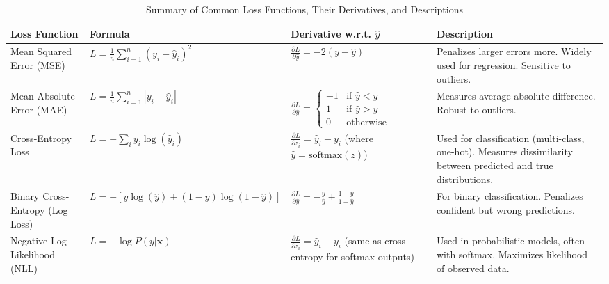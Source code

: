 \documentclass[a4paper, journal]{IEEEtran}
\begin{document}
\begin{table}[ht]
    \centering
    \caption{Summary of Common Loss Functions, Their Derivatives, and Descriptions}
    \begin{tabular}{@{}p{3cm}p{4cm}p{4.5cm}p{5cm}@{}}
        \toprule
        \textbf{Loss Function} & \textbf{Formula} & \textbf{Derivative w.r.t. $\hat{y}$} & \textbf{Description} \\
        \midrule
        Mean Squared Error (MSE) 
        & $L = \frac{1}{n}\sum_{i=1}^n (y_i - \hat{y}_i)^2$ 
        & $\frac{\partial L}{\partial \hat{y}} = -2(y - \hat{y})$ 
        & Penalizes larger errors more. Widely used for regression. Sensitive to outliers. \\

        Mean Absolute Error (MAE) 
        & $L = \frac{1}{n}\sum_{i=1}^n |y_i - \hat{y}_i|$ 
        & $\frac{\partial L}{\partial \hat{y}} = \begin{cases} -1 & \text{if } \hat{y} < y \\ 1 & \text{if } \hat{y} > y \\ 0 & \text{otherwise} \end{cases}$ 
        & Measures average absolute difference. Robust to outliers. \\

        Cross-Entropy Loss 
        & $L = -\sum_{i} y_i \log(\hat{y}_i)$ 
        & $\frac{\partial L}{\partial z_i} = \hat{y}_i - y_i$ \newline (where $\hat{y} = \text{softmax}(z)$)
        & Used for classification (multi-class, one-hot). Measures dissimilarity between predicted and true distributions. \\

        Binary Cross-Entropy (Log Loss) 
        & $L = -[y \log(\hat{y}) + (1-y)\log(1-\hat{y})]$ 
        & $\frac{\partial L}{\partial \hat{y}} = -\frac{y}{\hat{y}} + \frac{1-y}{1-\hat{y}}$ 
        & For binary classification. Penalizes confident but wrong predictions. \\

        Negative Log Likelihood (NLL) 
        & $L = -\log P(y|\mathbf{x})$ 
        & $\frac{\partial L}{\partial z_i} = \hat{y}_i - y_i$ \newline (same as cross-entropy for softmax outputs) 
        & Used in probabilistic models, often with softmax. Maximizes likelihood of observed data. \\

        \bottomrule
    \end{tabular}
\end{table}
\end{document}
